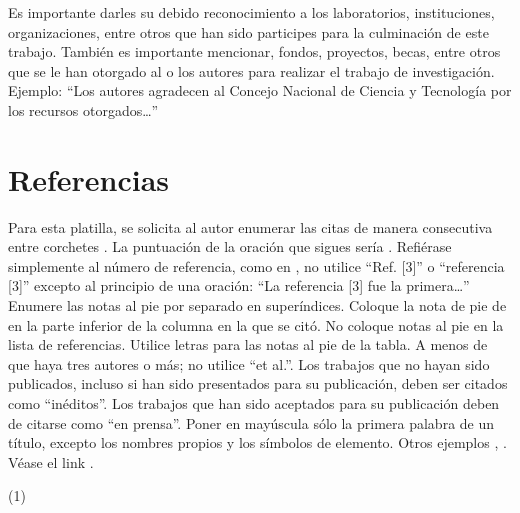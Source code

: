     Es importante darles su debido reconocimiento a los laboratorios, instituciones, organizaciones, entre otros que han sido participes para la culminación de este trabajo. También es importante mencionar, fondos, proyectos, becas, entre otros que se le han otorgado al o los autores para realizar el trabajo de investigación. Ejemplo: “Los autores agradecen al Concejo Nacional de Ciencia y Tecnología por los recursos otorgados…”
    
    \section*{Referencias}
    
    Para esta platilla, se solicita al autor enumerar las citas de manera consecutiva entre corchetes \cite{YLi2013}. 
    La puntuación de la oración que sigues sería \cite{Mesaelides2011}. 
    Refiérase simplemente al número de referencia, como en \cite{Morales2012}, no utilice “Ref. [3]” o “referencia [3]” excepto al principio de una oración: “La referencia [3] fue la primera…”
    Enumere las notas al pie por separado en superíndices. Coloque la nota de pie de en la parte inferior de la columna en la que se citó. No coloque notas al pie en la lista de referencias. Utilice letras para las notas al pie de la tabla.
    A menos de que haya tres autores o más; no utilice “et al.”. Los trabajos que no hayan sido publicados, incluso si han sido presentados para su publicación, deben ser citados como “inéditos”. Los trabajos que han sido aceptados para su publicación deben de citarse como “en prensa”. Poner en mayúscula sólo la primera palabra de un título, excepto los nombres propios y los símbolos de elemento. 
    Otros ejemplos \cite{LAAngeles2021}, \cite{LAAngelesConni}. 
    Véase el link \cite{prueba}.
    
    
    (1) \cite{Niebel}
    
    
